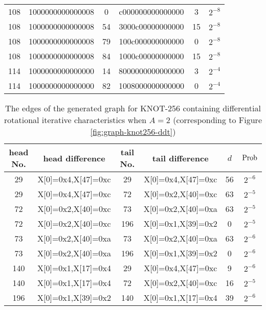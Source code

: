 \begin{table}
\begin{tabular}{|c|c|c|c|c|c|}
        108 & 1000000000000008 & 0 & c000000000000000 & 3 & $2^{-8}$ \\
        108 & 1000000000000008 & 54 & 3000c00000000000 & 15 & $2^{-8}$ \\
        108 & 1000000000000008 & 79 & 100c000000000000 & 0 & $2^{-8}$ \\
        108 & 1000000000000008 & 84 & 1000c00000000000 & 15 & $2^{-8}$ \\
        114 & 1000000000000000 & 14 & 8000000000000000 & 3 & $2^{-4}$ \\
        114 & 1000000000000000 & 82 & 1008000000000000 & 0 & $2^{-4}$ \\        
		\hline
	\end{tabular}
\end{table}

\begin{table}
	\caption{The edges of the generated graph for KNOT-256 containing differential rotational iterative characteristics when $A=2$ (corresponding to Figure \ref{fig:graph-knot256-ddt})}\label{tab:dis-knot256-ddt}
	\centering
	\begin{tabular}{|c|c|c|c|c|c|}
		\hline
		head No. & head difference & tail No. & tail difference & $d$ & $\text{Prob}$ \\
		\hline
		29 & X[0]=0x4,X[47]=0xc & 29 & X[0]=0x4,X[47]=0xc & 56 & $2^{-6}$ \\
        29 & X[0]=0x4,X[47]=0xc & 72 & X[0]=0x2,X[40]=0xc & 63 & $2^{-5}$ \\
        72 & X[0]=0x2,X[40]=0xc & 73 & X[0]=0x2,X[40]=0xa & 63 & $2^{-5}$ \\
        72 & X[0]=0x2,X[40]=0xc & 196 & X[0]=0x1,X[39]=0x2 & 0 & $2^{-5}$ \\
        73 & X[0]=0x2,X[40]=0xa & 73 & X[0]=0x2,X[40]=0xa & 63 & $2^{-6}$ \\
        73 & X[0]=0x2,X[40]=0xa & 196 & X[0]=0x1,X[39]=0x2 & 0 & $2^{-6}$ \\
        140 & X[0]=0x1,X[17]=0x4 & 29 & X[0]=0x4,X[47]=0xc & 9 & $2^{-6}$ \\
        140 & X[0]=0x1,X[17]=0x4 & 72 & X[0]=0x2,X[40]=0xc & 16 & $2^{-5}$ \\
        196 & X[0]=0x1,X[39]=0x2 & 140 & X[0]=0x1,X[17]=0x4 & 39 & $2^{-6}$ \\
		\hline
	\end{tabular}
\end{table}

